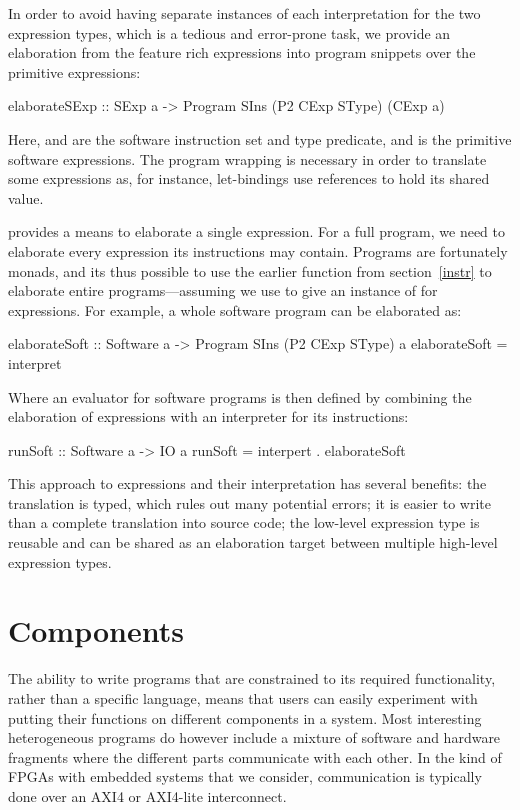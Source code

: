 \documentclass[../paper.tex]{subfiles}
\begin{document}
In order to avoid having separate instances of each interpretation for the two expression types, which is a tedious and error-prone task, we provide an elaboration from the feature rich expressions into program snippets over the primitive expressions:

\begin{code}
elaborateSExp :: SExp a -> Program SIns (P2 CExp SType) (CExp a)
\end{code}

\noindent Here,  and  are the software instruction set and type predicate, and  is the primitive software expressions. The program wrapping is necessary in order to translate some expressions as, for instance, let-bindings use references to hold its shared value.

 provides a means to elaborate a single expression. For a full program, we need to elaborate every expression its instructions may contain. Programs are fortunately monads, and its thus possible to use the earlier  function from section~\ref{instr} to elaborate entire programs---assuming we use  to give an instance of  for expressions. For example, a whole software program can be elaborated as:

\begin{code}
elaborateSoft :: Software a -> Program SIns (P2 CExp SType) a
elaborateSoft = interpret
\end{code}

\noindent Where an evaluator for software programs is then defined by combining the elaboration of expressions with an interpreter for its instructions:

\begin{code}
runSoft :: Software a -> IO a
runSoft = interpert . elaborateSoft
\end{code}

This approach to expressions and their interpretation has several benefits: the translation is typed, which rules out many potential errors; it is easier to write than a complete translation into source code; the low-level expression type is reusable and can be shared as an elaboration target between multiple high-level expression types.

\section{Components}

The ability to write programs that are constrained to its required functionality, rather than a specific language, means that users can easily experiment with putting their functions on different components in a system. Most interesting heterogeneous programs do however include a mixture of software and hardware fragments where the different parts communicate with each other. In the kind of FPGAs with embedded systems that we consider, communication is typically done over an AXI4 or AXI4-lite interconnect. 
\end{document}
